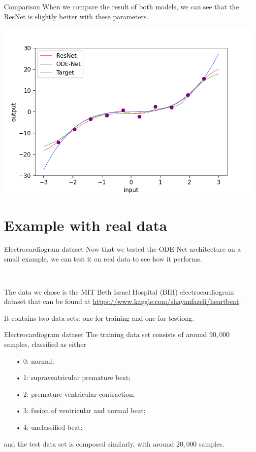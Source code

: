 \documentclass[11pt]{beamer}
\begin{document}
\begin{frame}{Comparison}
When we compare the result of both models, we can see that the ResNet is slightly better with these parameters.
\begin{center}
\includegraphics[scale=0.45]{comparaison_final.png}
\end{center}
\end{frame}

\section{Example with real data}
\begin{frame}{Electrocardiogram dataset}
Now that we tested the ODE-Net architecture on a small example, we can test it on real data to see how it performs.

~

The data we chose is the MIT Beth Israel Hospital (BIH) electrocardiogram dataset that can be found at \url{https://www.kaggle.com/shayanfazeli/heartbeat}. 

It contains two data sets: one for training and one for testiong.
\end{frame}

\begin{frame}{Electrocardiogram dataset}
The training data set consists of around $90,000$ samples, classified as either
\begin{itemize}
\item[•] 0: normal;
\item[•] 1: supraventricular premature beat;
\item[•] 2: premature ventricular contraction;
\item[•] 3: fusion of ventricular and normal beat;
\item[•] 4: unclassified beat;
\end{itemize}
and the test data set is composed similarly, with around $20,000$ samples.
\end{frame}
\end{document}
